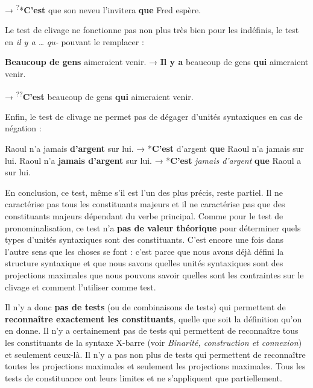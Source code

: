 {                            \textrm{→}  \textsuperscript{?}{*}\textbf{{C’est}}  {que son neveu l’invitera} \textbf{{que}}  {Fred espère.}
    \z

    Le test de clivage ne fonctionne pas non plus très bien pour les indéfinis, le test en \textit{il y a …} \textit{qu-} pouvant le remplacer :

    \ea
        \textbf{{Beaucoup de gens}}  {aimeraient venir.}     \textrm{→}    \textbf{{Il y a}}  {beaucoup de gens} \textbf{{qui}}  {aimeraient venir.}

                            \textrm{→}    \textsuperscript{??}\textbf{{C’est}}  {beaucoup de gens} \textbf{{qui}}  {aimeraient venir.}
    \z

    Enfin, le test de clivage ne permet pas de dégager d’unités syntaxiques en cas de négation :

    \ea
        {Raoul n’a}  {jamais} \textbf{{d’argent}} {sur lui.}          \textrm{→}  *\textbf{{C’est}} {d’argent} \textbf{{que}}  {Raoul n’a} {jamais sur lui.}
    \z
    \ea
        {Raoul n’a} \textbf{{jamais d’argent}}  {sur lui.}         \textrm{→}  *\textbf{{C’est}} \textit{jamais d’argent} \textbf{{que}}  {Raoul a sur lui.}
    \z

    En conclusion, ce test, même s’il est l’un des plus précis, reste partiel. Il ne caractérise pas tous les constituants majeurs et il ne caractérise pas que des constituants majeurs dépendant du verbe principal. Comme pour le test de pronominalisation, ce test n’a \textbf{pas de valeur théorique} pour déterminer quels types d’unités syntaxiques sont des constituants. C’est encore une fois dans l’autre sens que les choses se font : c’est parce que nous avons déjà défini la structure syntaxique et que nous savons quelles unités syntaxiques sont des projections maximales que nous pouvons savoir quelles sont les contraintes sur le clivage et comment l’utiliser comme test.

    Il n’y a donc \textbf{pas de tests} (ou de combinaisons de tests) qui permettent de \textbf{reconnaître exactement les constituants}, quelle que soit la définition qu’on en donne. Il n’y a certainement pas de tests qui permettent de reconnaître tous les constituants de la syntaxe X-barre (voir  \textit{Binarité, construction et connexion}) et seulement ceux-là. Il n’y a pas non plus de tests qui permettent de reconnaître toutes les projections maximales et seulement les projections maximales. Tous les tests de constituance ont leurs limites et ne s’appliquent que partiellement.

}
